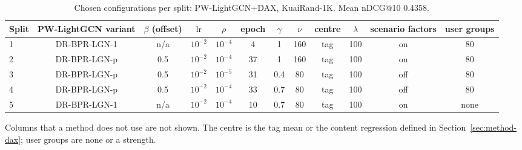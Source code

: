 \begin{table}[tbp]
\centering
\footnotesize
\caption{Chosen configurations per split: PW-LightGCN+DAX, KuaiRand-1K. Mean nDCG@10 0.4358.}
\label{tab:grid13}
\begin{adjustbox}{max width=\linewidth}
\begin{tabular}{lccccccccccc}
\toprule
Split & PW-LightGCN variant & $\beta$ (offset) & $\mathrm{lr}$ & $\rho$ & epoch & $\gamma$ & $\nu$ & centre & $\lambda$ & scenario factors & user groups \\
\midrule
1 & DR-BPR-LGN-1 & n/a & $10^{-2}$ & $10^{-4}$ & 4 & 1 & 160 & tag & 100 & on & 80 \\
2 & DR-BPR-LGN-p & 0.5 & $10^{-2}$ & $10^{-4}$ & 37 & 1 & 160 & tag & 100 & on & 80 \\
3 & DR-BPR-LGN-p & 0.5 & $10^{-2}$ & $10^{-5}$ & 31 & 0.4 & 80 & tag & 100 & off & 80 \\
4 & DR-BPR-LGN-p & 0.5 & $10^{-2}$ & $10^{-4}$ & 33 & 0.7 & 80 & tag & 100 & off & 80 \\
5 & DR-BPR-LGN-1 & n/a & $10^{-2}$ & $10^{-4}$ & 10 & 0.7 & 80 & tag & 100 & on & none \\
\bottomrule
\end{tabular}
\end{adjustbox}
\par\smallskip
\begin{minipage}{\linewidth}\raggedright\footnotesize Columns that a method does not use are not shown. The centre is the tag mean or the content regression defined in Section~\ref{sec:method-dax}; user groups are none or a strength.\end{minipage}
\end{table}
